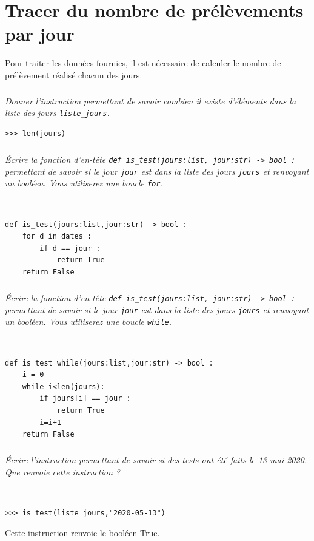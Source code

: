 \documentclass[10pt,fleqn]{article} %
\begin{document}
\fi

\section{Tracer du nombre de prélèvements par jour}

Pour traiter les données fournies, il est nécessaire de calculer le nombre de prélèvement réalisé chacun des jours. 

\subparagraph{}
\textit{Donner l'instruction permettant de savoir combien il existe d'éléments dans la liste des jours \texttt{liste\_jours}.}
\ifprof
\begin{corrige}
\begin{lstlisting}
>>> len(jours)
\end{lstlisting}
\end{corrige}
\else
\fi

\subparagraph{}
\textit{Écrire la fonction d’en-tête \texttt{def is\_test(jours:list, jour:str) -> bool :} permettant de savoir si le jour \texttt{jour} est dans la liste des jours \texttt{jours} et renvoyant un booléen. Vous utiliserez une boucle \texttt{for}.}
\ifprof
\begin{corrige}~\\
\begin{lstlisting}
def is_test(jours:list,jour:str) -> bool :
    for d in dates :
        if d == jour :
            return True
    return False
\end{lstlisting}
\end{corrige}
\else
\fi



\subparagraph{}
\textit{Écrire la fonction d’en-tête \texttt{def is\_test(jours:list, jour:str) -> bool :} permettant de savoir si le jour \texttt{jour} est dans la liste des jours \texttt{jours} et renvoyant un booléen. Vous utiliserez une boucle \texttt{while}.}
\ifprof
\begin{corrige}~\\
\begin{lstlisting}
def is_test_while(jours:list,jour:str) -> bool :
    i = 0
    while i<len(jours): 
        if jours[i] == jour :
            return True
        i=i+1
    return False
\end{lstlisting}
\end{corrige}
\else
\fi


\subparagraph{}
\textit{Écrire l'instruction permettant de savoir si des tests ont été faits le 13 mai 2020. Que renvoie cette instruction ?}
\ifprof
\begin{corrige}~\\
\begin{lstlisting}
>>> is_test(liste_jours,"2020-05-13")
\end{lstlisting}
Cette instruction renvoie le booléen True. 
\end{corrige}
\else
\fi
\end{document}
